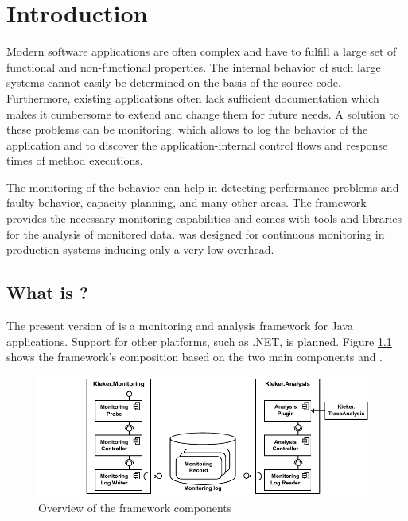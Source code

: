 % 


\chapter{Introduction}\label{chap:introduction}

Modern software applications are often complex and have to fulfill a large set of functional and non-functional properties. The internal behavior of such large systems cannot easily be determined on the basis of the source code. Furthermore, existing applications often lack sufficient documentation which makes it cumbersome to extend and change them for future needs. A solution to these problems can be monitoring, which allows to log the behavior of the application and to discover the application-internal control flows and response times of method executions.

The monitoring of the behavior can help in detecting performance problems and faulty behavior, capacity planning, and many other areas. The \Kieker{} framework provides the necessary monitoring capabilities and comes with tools and libraries for the analysis of monitored data. \Kieker{} was designed for %
continuous monitoring in production systems inducing only a very low overhead. 

\section{What is \Kieker?}\label{sec:kieker}

The present version of \Kieker{} is a monitoring and analysis framework for %
Java applications. %
Support for other platforms, such as .NET, is planned. %
Figure \ref{fig:KiekerComponentDiagram} shows the framework's composition based %
on the two main components \KiekerMonitoringPart{} and \KiekerAnalysisPart{}. %

\begin{figure}[H]\centering
\includegraphics[width=0.98\textwidth]{images/kiekerComponentDiagram-woCloud-bw-w-record-newNames-withTraceAnalysis}
\caption{Overview of the framework components}
\label{fig:KiekerComponentDiagram}
\end{figure}
		
